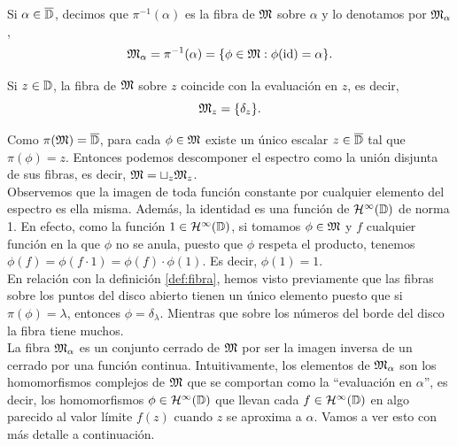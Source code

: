 \begin{definition}
    \label{def:fibra}
    Si $\alpha \in \overline{\mathbb{D}}$, decimos que $\pi^{-1} (\alpha)$ es la fibra de $\mathfrak{M}$ sobre $\alpha$ y lo denotamos por $\mathfrak{M}_\alpha$,
    \begin{equation*}
        \mathfrak{M}_\alpha = \pi^{-1} (\alpha) = \{\phi \in \mathfrak{M} : \phi (\operatorname{id}) = \alpha\}.
    \end{equation*}
\end{definition}

Si $z \in \mathbb{D}$, la fibra de $\mathfrak{M}$ sobre $z$ coincide con la evaluación en $z$, es decir,
\begin{equation*}
    \mathfrak{M}_z = \{ \delta_z\}.
\end{equation*}

Como $\pi(\mathfrak{M}) = \overline{\mathbb{D}}$, para cada $\phi \in \mathfrak{M}$ existe un único escalar $z \in \overline{\mathbb{D}}$ tal que $\pi(\phi) = z$. Entonces podemos descomponer el espectro como la unión disjunta de sus fibras, es decir, $\mathfrak{M} = \sqcup_{z} \mathfrak{M}_z$. \\

Observemos que la imagen de toda función constante por cualquier elemento del espectro es ella misma. Además, la identidad es una función de $\mathcal{H}^{\infty}(\mathbb{D})$ de norma 1. En efecto, como la función $1 \in \mathcal{H}^{\infty}(\mathbb{D})$, si tomamos $\phi \in \mathfrak{M}$ y $f$ cualquier función en la que $\phi$ no se anula, puesto que $\phi$ respeta el producto, tenemos $\phi(f) = \phi(f \cdot 1) = \phi(f) \cdot \phi(1)$. Es decir, $\phi(1) = 1$. \\

En relación con la definición \ref{def:fibra}, hemos visto previamente que las fibras sobre los puntos del disco abierto tienen un único elemento puesto que si $\pi(\phi)=\lambda$, entonces $\phi = \delta_\lambda$. Mientras que sobre los números del borde del disco la fibra tiene muchos. \\

La fibra $\mathfrak{M}_\alpha$ es un conjunto cerrado de $\mathfrak{M}$ por ser la imagen inversa de un cerrado por una función continua. Intuitivamente, los elementos de $\mathfrak{M}_\alpha$ son los homomorfismos complejos de $\mathfrak{M}$ que se comportan como la ``evaluación en $\alpha$'', es decir, los homomorfismos $\phi \in \mathcal{H}^{\infty}(\mathbb{D})$ que llevan cada $f \in \mathcal{H}^{\infty}(\mathbb{D})$ en algo parecido al valor límite $f(z)$ cuando $z$ se aproxima a $\alpha$. Vamos a ver esto con más detalle a continuación. \\

